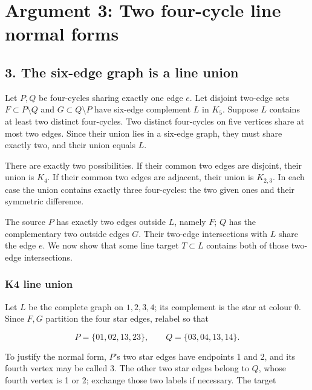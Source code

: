 \documentclass[
  10pt,
]{article}
\begin{document}
\hypertarget{arg-3}{%
\section{Argument 3: Two four-cycle line normal forms}\label{arg-3}}

\hypertarget{the-six-edge-graph-is-a-line-union}{%
\subsection*{3. The six-edge graph is a line
union}\label{the-six-edge-graph-is-a-line-union}}

Let \(P,Q\) be four-cycles sharing exactly one edge \(e\). Let disjoint
two-edge sets \(F\subset P\setminus Q\) and \(G\subset Q\setminus P\)
have six-edge complement \(L\) in \(K_5\). Suppose \(L\) contains at
least two distinct four-cycles. Two distinct four-cycles on five
vertices share at most two edges. Since their union lies in a six-edge
graph, they must share exactly two, and their union equals \(L\).

There are exactly two possibilities. If their common two edges are
disjoint, their union is \(K_4\). If their common two edges are
adjacent, their union is \(K_{2,3}\). In each case the union contains
exactly three four-cycles: the two given ones and their symmetric
difference.

The source \(P\) has exactly two edges outside \(L\), namely \(F\);
\(Q\) has the complementary two outside edges \(G\). Their two-edge
intersections with \(L\) share the edge \(e\). We now show that some
line target \(T\subset L\) contains both of those two-edge
intersections.

\hypertarget{k4-line-union}{%
\subsubsection*{K4 line union}\label{k4-line-union}}

Let \(L\) be the complete graph on \(1,2,3,4\); its complement is the
star at colour 0. Since \(F,G\) partition the four star edges, relabel
so that

\[
P=\{01,02,13,23\},\qquad
Q=\{03,04,13,14\}.
\]

To justify the normal form, \(P\)'s two star edges have endpoints 1 and
2, and its fourth vertex may be called 3. The other two star edges
belong to \(Q\), whose fourth vertex is 1 or 2; exchange those two
labels if necessary. The target
\end{document}
